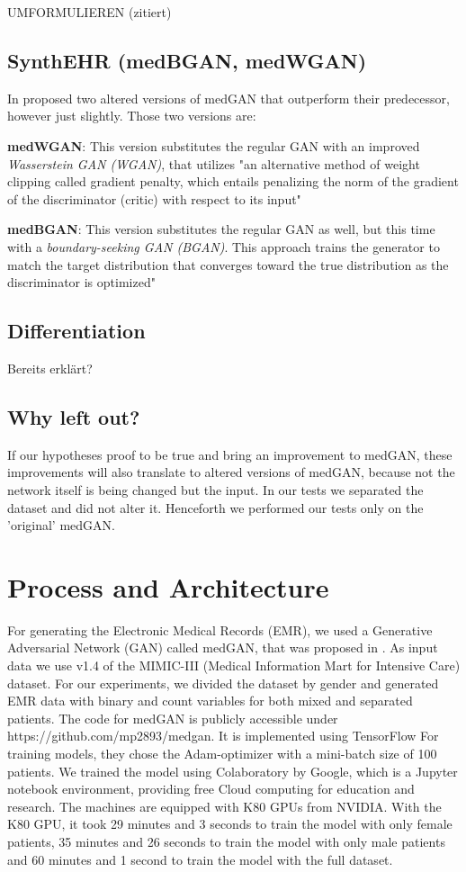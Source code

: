 \documentclass[11pt, a4paper]{book}
\begin{document}
UMFORMULIEREN (zitiert)

\subsection{SynthEHR (medBGAN, medWGAN)}
In \citep{Baowaly2018} proposed two altered versions of medGAN that outperform their predecessor, however just slightly.
Those two versions are:

\textbf{medWGAN}: This version substitutes the regular GAN with an improved \textit{Wasserstein GAN (WGAN)}, that utilizes "an alternative method of weight clipping called gradient penalty, which entails penalizing the norm of the gradient of the discriminator (critic) with respect to its input" \citep{Baowaly2018}

\textbf{medBGAN}: This version substitutes the regular GAN as well, but this time with a \textit{boundary-seeking GAN (BGAN)}. This approach trains the generator to match the target distribution that converges toward the true distribution as the discriminator is optimized" \citep{Baowaly2018}
\subsection{Differentiation}
Bereits erklärt?
\subsection{Why left out?}
If our hypotheses proof to be true and bring an improvement to medGAN, these improvements will also translate to altered versions of medGAN, because not the network itself is being changed but the input. In our tests we separated the dataset and did not alter it. Henceforth we performed our tests only on the 'original' medGAN. 
\section{Process and Architecture}
For generating the Electronic Medical Records (EMR), we used a Generative Adversarial Network (GAN) called medGAN, that was proposed in \citep{Choi2017}. As input data we use v1.4 of the MIMIC-III (Medical Information Mart for Intensive Care) dataset. For our experiments, we divided the dataset by gender and generated EMR data with binary and count variables for both mixed and separated patients. The code for medGAN is publicly accessible under https://github.com/mp2893/medgan. It is implemented using TensorFlow
For training models, they chose the Adam-optimizer with a mini-batch size of 100 patients. \citep{Choi2017} We trained the model using Colaboratory by Google, which is a Jupyter notebook environment, providing free Cloud computing for education and research.
The machines are equipped with K80 GPUs from NVIDIA.
With the K80 GPU, it took 29 minutes and 3 seconds to train the model with only female patients, 35 minutes and 26 seconds to train the model with only male patients and 60 minutes and 1 second to train the model with the full dataset.
\end{document}
